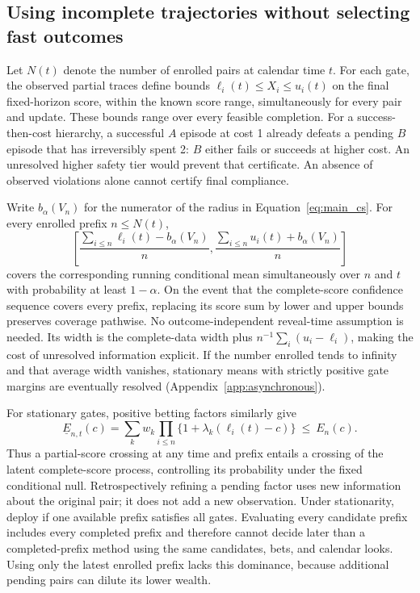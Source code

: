 \documentclass{article}
\begin{document}
\subsection{Using incomplete trajectories without selecting fast outcomes}
\label{sec:partial}
Let $N(t)$ denote the number of enrolled pairs at calendar time $t$.
For each gate, the observed partial traces define bounds
$\ell_i(t)\leq X_i\leq u_i(t)$ on the final fixed-horizon score,
within the known score range, simultaneously for every pair and update.
These bounds range over every
feasible completion. For a success-then-cost hierarchy, a successful
$A$ episode at cost 1 already defeats a pending $B$ episode that has
irreversibly spent 2: $B$ either fails or succeeds at higher cost.
An unresolved higher safety tier would prevent that certificate.
An absence of observed violations alone cannot certify final compliance.

Write $b_\alpha(V_n)$ for the numerator of the radius in
Equation~\eqref{eq:main_cs}. For every enrolled prefix $n\leq N(t)$,
\begin{equation}
 \left[\frac{\sum_{i\leq n}\ell_i(t)-b_\alpha(V_n)}{n},
       \frac{\sum_{i\leq n}u_i(t)+b_\alpha(V_n)}{n}\right]
 \label{eq:main_partial_cs}
\end{equation}
covers the corresponding running conditional mean simultaneously over
$n$ and $t$ with probability at least $1-\alpha$. On the event that
the complete-score confidence sequence covers every prefix, replacing
its score sum by lower and upper bounds preserves coverage pathwise.
No outcome-independent reveal-time assumption is needed. Its width is
the complete-data width plus $n^{-1}\sum_i(u_i-\ell_i)$, making the
cost of unresolved information explicit. If the number enrolled tends to infinity and that average width vanishes,
stationary means with strictly positive gate margins are eventually
resolved (Appendix~\ref{app:asynchronous}).

For stationary gates, positive betting factors similarly give
\begin{equation}
 \underline E_{n,t}(c)=\sum_k w_k\prod_{i\leq n}
            \{1+\lambda_k(\ell_i(t)-c)\}\ \leq\ E_n(c).
 \label{eq:main_partial_wealth}
\end{equation}
Thus a partial-score crossing at any time and prefix entails a crossing
of the latent complete-score process, controlling its probability under
the fixed conditional null. Retrospectively refining a pending factor
uses new information about the original pair; it does not add a new
observation. Under stationarity, deploy if one available prefix satisfies
all gates. Evaluating every candidate prefix includes every completed
prefix and therefore cannot decide later than a completed-prefix method
using the same candidates, bets, and calendar looks. Using only the
latest enrolled prefix lacks this dominance, because additional pending
pairs can dilute its lower wealth.
\end{document}
